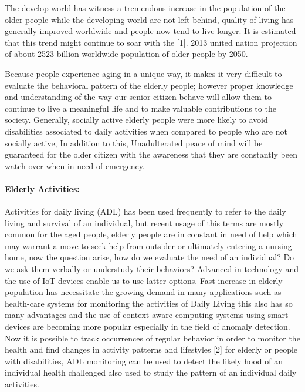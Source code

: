 \documentclass[a4paper, parskip=full]{scrartcl}
\begin{document}
The develop world has witness a tremendous increase in the population of the older people while the developing world are not left behind, quality of living has generally improved worldwide and people now tend to live longer.  It is estimated that this trend might continue to soar with the [1]. 2013 united nation projection of about 2523 billion worldwide population of older people by 2050.

Because people experience aging in a unique way, it makes it very difficult to evaluate the behavioral pattern of the elderly people; however proper knowledge and understanding of the way our senior citizen behave will allow them to continue to live a meaningful life and to make valuable contributions to the society. Generally, socially active elderly people were more likely to avoid disabilities associated to daily activities when compared to people who are not socially active, In addition to this, Unadulterated peace of mind will be guaranteed for the older citizen with the awareness that they are constantly been watch over when in need of emergency. 

\paragraph*{Elderly Activities:}

Activities for daily living (ADL) has been used frequently to refer to the daily living and survival of an individual, but recent usage of this terms are mostly common for the aged people, elderly people are in constant in need of help which may warrant a move to seek help from outsider or ultimately entering a nursing home, now the question arise, how do we evaluate the need of an individual? Do we ask them verbally or understudy their behaviors? Advanced in technology and the use of IoT devices enable us to use latter options. Fast increase in elderly population has necessitate the growing demand in many applications such as health-care systems for monitoring the activities of Daily Living this also has so many advantages and the use of context aware computing systems using smart devices are becoming more popular especially in the field of anomaly detection. Now it is possible to track occurrences of regular behavior in order to monitor the health and find changes in activity patterns and lifestyles [2] for elderly or people with disabilities, ADL monitoring can be used to detect the likely hood of an individual health challenged also used to study the pattern of an individual daily activities.
\end{document}

